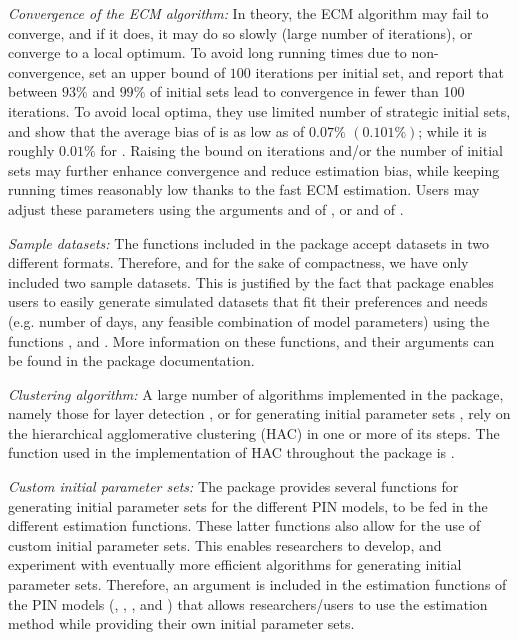 \noindent \textit{Convergence of the ECM algorithm:}  In theory, the ECM algorithm may fail to converge, and if it does, it may do so slowly (large number of iterations), or converge to a local optimum. To avoid long running times due to non-convergence, \cite{ghachem2022maximum} set an upper bound of $100$ iterations per initial set, and report that between $93\%$ and $99\%$ of initial sets lead to convergence in fewer than 100 iterations. To avoid local optima, they use limited number of strategic initial sets, and show that the average bias of  is as low as of $0.07\%$ $(0.101\%)$; while it is roughly $0.01\%$ for . Raising the bound on iterations and/or the number of initial sets may further enhance convergence and reduce estimation bias, while keeping running times reasonably low thanks to the fast ECM estimation.
Users may adjust these parameters using the arguments  and  of , or  and  of .

\vspace{1mm}

\noindent \textit{Sample datasets:} The functions included in the package accept datasets in two different formats. Therefore, and for the sake of compactness, we have only included two sample datasets. This is justified by the fact that package enables users to easily generate simulated datasets that fit their preferences and needs (e.g. number of days, any feasible combination of model parameters) using the functions , and . More information on these functions, and their arguments can be found in the package documentation.

\vspace{1mm}

\noindent \textit{Clustering algorithm:} 
A large number of algorithms implemented in the package,  namely those for layer detection \citep{ersan2016multilayer, Ersan2022Identifying}, or for generating initial parameter sets \citep{Gan2015faster, Ersan2016unbiased,ersan2016multilayer,Ersan2022methodological}, rely on the hierarchical agglomerative clustering (HAC) in one or more of its steps. The function used in the implementation of HAC throughout the package is . 
\vspace{1mm}

\noindent \textit{Custom initial parameter sets:} The package provides several functions for generating initial parameter sets for the different PIN models, to be fed in the different estimation functions. These latter functions also allow for the use of custom initial parameter sets. This enables researchers to develop, and experiment with eventually more efficient algorithms for generating initial parameter sets. Therefore, an argument  is included in the estimation functions of the PIN models (, , , and ) that allows researchers/users to use the estimation method while providing their own initial parameter sets.

